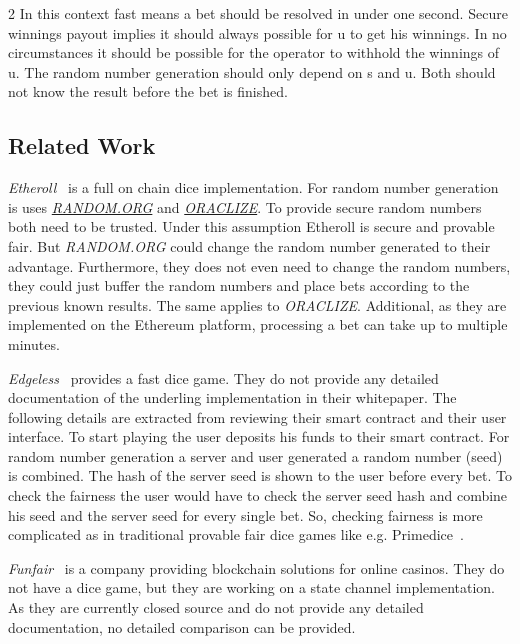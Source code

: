 \documentclass[oneside]{amsart}
\makeatletter
\newcommand*\eg{e.g.\@\xspace}
\makeatother
\begin{document}
\begin{multicols}{2}
In this context fast means a bet should be resolved in under one second.
Secure winnings payout implies it should always possible for \gls{u} to get his winnings.
In no circumstances it should be possible for the operator to withhold the winnings of \gls{u}.
The random number generation should only depend on \gls{s} and \gls{u}.
Both should not know the result before the bet is finished.

\subsection{Related Work}\label{subsec:related_work}
\emph{Etheroll}~\cite{Etheroll} is a full on chain dice implementation.
For random number generation is uses \href{https://random.org}{\emph{RANDOM.ORG}} and \href{https://oraclize.it}{\emph{ORACLIZE}}.
To provide secure random numbers both need to be trusted.
Under this assumption Etheroll is secure and provable fair.
But \emph{RANDOM.ORG} could change the random number generated to their advantage.
Furthermore, they does not even need to change the random numbers, they could just buffer the random numbers
and place bets according to the previous known results.
The same applies to \emph{ORACLIZE}.
Additional, as they are implemented on the Ethereum platform, processing a bet can take up to multiple minutes.

\emph{Edgeless}~\cite{Edgeless} provides a fast dice game.
They do not provide any detailed documentation of the underling implementation in their whitepaper.
The following details are extracted from reviewing their smart contract and their user interface.
To start playing the user deposits his funds to their smart contract.
For random number generation a server and user generated a random number (seed) is combined.
The hash of the server seed is shown to the user before every bet.
To check the fairness the user would have to check the server seed hash and combine his seed and the server seed
for every single bet.
So, checking fairness is more complicated as in traditional provable fair dice games like \eg Primedice~\cite{primedice}.

\emph{Funfair}~\cite{Funfair} is a company providing blockchain solutions for online casinos.
They do not have a dice game, but they are working on a state channel implementation.
As they are currently closed source and do not provide any detailed documentation, no detailed comparison
can be provided.


\end{multicols}
\end{document}

